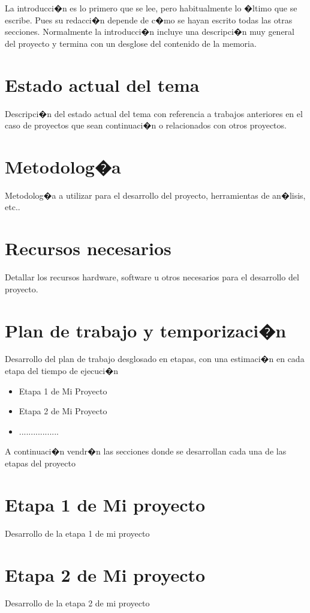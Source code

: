 \documentclass[12pt,letter,spanish]{book}
\begin{document}
  La introducci�n es lo primero que se lee, pero habitualmente lo �ltimo que se escribe. Pues su redacci�n
  depende de c�mo se hayan escrito todas las otras secciones. Normalmente la introducci�n incluye una
  descripci�n muy general del proyecto y termina con un desglose del contenido de la memoria.

\chapter{Estado actual del tema}
  Descripci�n del estado actual del tema con referencia a trabajos anteriores en el caso de proyectos que
  sean continuaci�n o relacionados con otros proyectos.

\chapter{Metodolog�a}
  Metodolog�a a utilizar para el desarrollo del proyecto, herramientas de an�lisis, etc..

\chapter{Recursos necesarios}
  Detallar los recursos hardware, software u otros necesarios para el desarrollo del proyecto.

\chapter{Plan de trabajo y temporizaci�n}
Desarrollo del plan de trabajo desglosado en etapas, con una estimaci�n en cada etapa del tiempo de ejecuci�n
\begin{itemize}
\item Etapa 1 de Mi Proyecto
\item Etapa 2 de Mi Proyecto
\item .................
\end{itemize}
A continuaci�n vendr�n las secciones donde se desarrollan cada una de las etapas del proyecto


\chapter{Etapa 1 de Mi proyecto}
  Desarrollo de la etapa 1 de mi proyecto


\chapter{Etapa 2 de Mi proyecto}
  Desarrollo de la etapa 2 de mi proyecto
\end{document}
